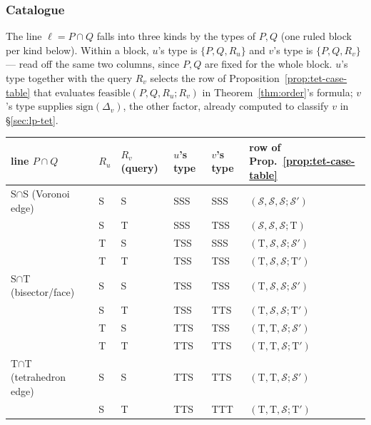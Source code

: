 \documentclass[12pt]{article}
\theoremstyle{definition}
\theoremstyle{remark}
\begin{document}
\subsubsection*{Catalogue}

The line $\ell=P\cap Q$ falls into three kinds by the types of $P,Q$ (one
ruled block per kind below). Within a block, $u$'s type is
$\{P,Q,R_u\}$ and $v$'s type is $\{P,Q,R_v\}$ --- read off the same two
columns, since $P,Q$ are fixed for the whole block. $u$'s type together
with the query $R_v$ selects the row of Proposition~\ref{prop:tet-case-table}
that evaluates $\mathrm{feasible}(P,Q,R_u;R_v)$ in
Theorem~\ref{thm:order}'s formula; $v$'s type supplies
$\mathrm{sign}(\Delta_v)$, the other factor, already computed to classify
$v$ in \S\ref{sec:lp-tet}.

\begin{table}[h!]
\centering
\small
\renewcommand{\arraystretch}{1.3}
\begin{tabular}{@{}llllll@{}}
\hline
\textbf{line $P\cap Q$} & \boldmath$R_u$ & \boldmath$R_v$ (query) & \textbf{$u$'s type} & \textbf{$v$'s type} & \textbf{row of Prop.~\ref{prop:tet-case-table}} \\
\hline
S$\cap$S (Voronoi edge)     & S & S & SSS & SSS & $(\mathcal S,\mathcal S,\mathcal S;\mathcal S')$ \\
                             & S & T & SSS & TSS & $(\mathcal S,\mathcal S,\mathcal S;\mathrm T)$ \\
                             & T & S & TSS & SSS & $(\mathrm T,\mathcal S,\mathcal S;\mathcal S')$ \\
                             & T & T & TSS & TSS & $(\mathrm T,\mathcal S,\mathcal S;\mathrm T')$ \\
\hline
S$\cap$T (bisector/face)    & S & S & TSS & TSS & $(\mathrm T,\mathcal S,\mathcal S;\mathcal S')$ \\
                             & S & T & TSS & TTS & $(\mathrm T,\mathcal S,\mathcal S;\mathrm T')$ \\
                             & T & S & TTS & TSS & $(\mathrm T,\mathrm T,\mathcal S;\mathcal S')$ \\
                             & T & T & TTS & TTS & $(\mathrm T,\mathrm T,\mathcal S;\mathrm T')$ \\
\hline
T$\cap$T (tetrahedron edge) & S & S & TTS & TTS & $(\mathrm T,\mathrm T,\mathcal S;\mathcal S')$ \\
                             & S & T & TTS & TTT & $(\mathrm T,\mathrm T,\mathcal S;\mathrm T')$ \\

\end{tabular}
\end{table}
\end{document}
